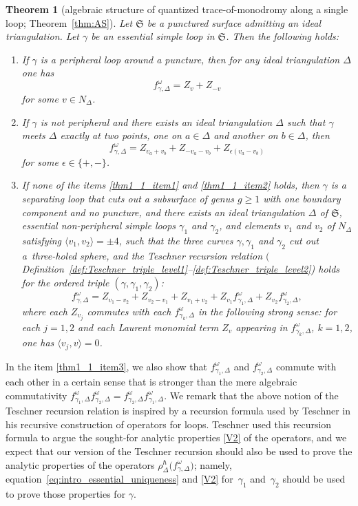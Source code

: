 \documentclass[pdftex]{sigma}
\numberwithin{equation}{section}
\newtheorem{Theorem}{Theorem}[section]
\theoremstyle{definition}
\begin{document}
\begin{Theorem}[algebraic structure of quantized trace-of-monodromy along a single loop; Theorem~\ref{thm:AS}]
\label{thm:main1}
Let $\mathfrak{S}$ be a punctured surface admitting an ideal triangulation. Let $\gamma$ be an essential simple loop in $\mathfrak{S}$. Then the following holds:
\begin{enumerate}[label={\rm (\arabic*)}]\itemsep=0pt
\item\label{thm1_1_item1} If $\gamma$ is a peripheral loop around a puncture, then for any ideal triangulation $\Delta$ one has
\[
f^\omega_{\gamma,\Delta} = Z_v + Z_{-v}
\]
for some $v\in N_\Delta$.
\item\label{thm1_1_item2} If $\gamma$ is not peripheral and there exists an ideal triangulation $\Delta$ such that $\gamma$ meets $\Delta$ exactly at two points, one on $a\in \Delta$ and another on $b\in \Delta$, then
\[
f^\omega_{\gamma,\Delta} = Z_{v_a+v_b} +Z_{-v_a-v_b} + Z_{\epsilon(v_a-v_b)}
\]
for some $\epsilon \in \{+,-\}$.
\item\label{thm1_1_item3} If none of the items {\rm \ref{thm1_1_item1}} and {\rm \ref{thm1_1_item2}} holds, then $\gamma$ is a separating loop that cuts out a subsurface of genus $g\ge 1$ with one boundary component and no puncture, and there exists an ideal triangulation $\Delta$ of $\mathfrak{S}$, essential non-peripheral simple loops $\gamma_1$ and $\gamma_2$, and elements $v_1$ and $v_2$ of $N_\Delta$ satisfying $\langle v_1,v_2\rangle =\pm 4$, such that the three curves $\gamma,\gamma_1$ and $\gamma_2$ cut out a~three-holed sphere, and the {\em Teschner recursion relation} $($Definition~{\rm \ref{def:Teschner_triple_level1}--\ref{def:Teschner_triple_level2})} holds for the ordered triple $(\gamma,\gamma_1,\gamma_2)$:
\[
f^\omega_{\gamma,\Delta} = Z_{ v_1 - v_2} + Z_{v_2 - v_1} + Z_{v_1 + v_2} + Z_{v_1} f^\omega_{\gamma_1,\Delta} + Z_{v_2} f^\omega_{\gamma_2,\Delta},
\]
where each $Z_{v_j}$ commutes with each $f^\omega_{\gamma_k,\Delta}$ in the following strong sense: for each $j=1,2$ and each Laurent monomial term $Z_v$ appearing in $f^\omega_{\gamma_k,\Delta}$, $k=1,2$, one has $\langle v_j, v\rangle=0$.
\end{enumerate}
\end{Theorem}
In the item \ref{thm1_1_item3}, we also show that $f^\omega_{\gamma_1,\Delta}$ and $f^\omega_{\gamma_2,\Delta}$ commute with each other in a certain sense that is stronger than the mere algebraic commutativity $f^\omega_{\gamma_1,\Delta}f^\omega_{\gamma_2,\Delta}=f^\omega_{\gamma_2,\Delta}f^\omega_{\gamma_1,\Delta}$. We remark that the above notion of the Teschner recursion relation is inspired by a recursion formula \cite[equation~(15.5) of Definition~6]{T} used by Teschner in his recursive construction of operators for loops. Teschner used this recursion formula to argue the sought-for analytic properties \ref{V2} of the operators, and we expect that our version of the Teschner recursion should also be used to prove the analytic properties of the operators $\rho^\hbar_\Delta\bigl(f^\omega_{\gamma,\Delta}\bigr)$; namely, equation~\eqref{eq:intro_essential_uniqueness} and \ref{V2} for~$\gamma_1$ and~$\gamma_2$ should be used to prove those properties for $\gamma$.
\end{document}
